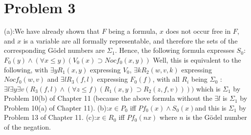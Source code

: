 \documentclass{article}
\theoremstyle{definition}
\begin{document}
\section*{Problem 3}
(a):\newline We have already shown that $F$ being a formula, $x$ does not occur free in $F$, and $x$ is a variable are all formally representable, and 
therefore the sets of the corresponding Gödel numbers are $\Sigma_1$. Hence, the following formula expresses $S_0$:\newline
$F_0(y)\wedge (\forall x\le y)(V_0(x)\supset Nocf_0(x,y))$\newline
Well, this is equivalent to the following, with $\exists yR_1(x,y)$ expressing $V_0$, $\exists kR_2(w,v,k)$ expressing $Nocf_0(w,v)$ and $\exists lR_3(f,l)$
expressing $F_0(f)$, with all $R_i$ being $\Sigma_0$
:\newline 
$\exists l\exists y\exists v(R_3(f,l)\wedge (\forall z\le f)(R_1(x,y)\supset R_2(z,f,v))))$\newline
which is $\Sigma_1$ by Problem 10(b) of Chapter 11 (because the above formula without the $\exists l$ is $\Sigma_1$ by Problem 10(a) of Chapter 11).\newline 
(b):\newline $x\in P_0$ iff $Pf_0(x)\wedge S_0(x)$\newline and this is $\Sigma_1$ by Problem 13 of Chapter 11.\newline
(c):\newline $x\in R_0$ iff $Pf_0(nx)$ where $n$ is the Gödel number of the negation.\newline 
\end{document}
